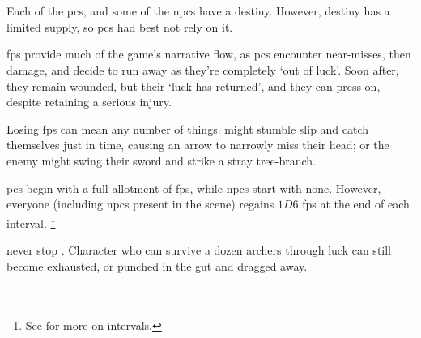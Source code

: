 \section{}
\label{fate_points}

\begin{multicols}{2}

\noindent
Each of the \glspl{pc}, and some of the \glspl{npc} have a destiny.
However, destiny has a limited supply, so \glspl{pc} had best not rely on it.



\Glspl{fp} provide much of the game's narrative flow, as \glspl{pc} encounter near-misses, then damage, and decide to run away as they're completely `out of luck'.
Soon after, they remain wounded, but their `luck has returned', and they can press-on, despite retaining a serious injury.

Losing \glspl{fp} can mean any number of things.
 might stumble slip and catch themselves just in time, causing an arrow to narrowly miss their head; or the enemy might swing their sword and strike a stray tree-branch.

\Glspl{pc} begin with a full allotment of \glspl{fp}, while \glspl{npc} start with none.
However, everyone (including \glspl{npc} present in the scene) regains $1D6$ \glspl{fp} at the end of each \gls{interval}.%
\footnote{See  for more on \glspl{interval}.}

 never stop .
Character who can survive a dozen archers through luck can still become exhausted, or punched in the gut and dragged away.

\end{multicols}

\section{}

